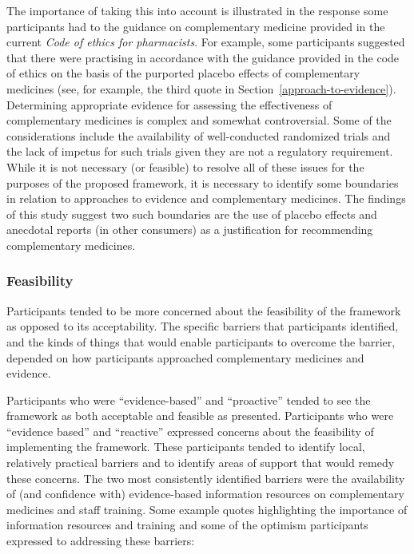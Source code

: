 \documentclass[11pt,a4paper]{article}
\begin{document}
The importance of taking this into account is illustrated in the
response some participants had to the guidance on complementary medicine
provided in the current \emph{Code of ethics for pharmacists}. For
example, some participants suggested that there were practising in
accordance with the guidance provided in the code of ethics on the basis
of the purported placebo effects of complementary medicines (see, for
example, the third quote in Section~\ref{approach-to-evidence}).
Determining appropriate evidence for assessing the effectiveness of
complementary medicines is complex and somewhat controversial. Some of
the considerations include the availability of well-conducted randomized
trials and the lack of impetus for such trials given they are not a
regulatory requirement. While it is not necessary (or feasible) to
resolve all of these issues for the purposes of the proposed framework,
it is necessary to identify some boundaries in relation to approaches to
evidence and complementary medicines. The findings of this study suggest
two such boundaries are the use of placebo effects and anecdotal reports
(in other consumers) as a justification for recommending complementary
medicines.

\subsubsection{Feasibility}\label{feasibility}

Participants tended to be more concerned about the feasibility of the
framework as opposed to its acceptability. The specific barriers that
participants identified, and the kinds of things that would enable
participants to overcome the barrier, depended on how participants
approached complementary medicines and evidence.

Participants who were ``evidence-based'' and ``proactive'' tended to see
the framework as both acceptable and feasible as presented. Participants
who were ``evidence based'' and ``reactive'' expressed concerns about
the feasibility of implementing the framework. These participants tended
to identify local, relatively practical barriers and to identify areas
of support that would remedy these concerns. The two most consistently
identified barriers were the availability of (and confidence with)
evidence-based information resources on complementary medicines and
staff training. Some example quotes highlighting the importance of
information resources and training and some of the optimism participants
expressed to addressing these barriers:
\end{document}
